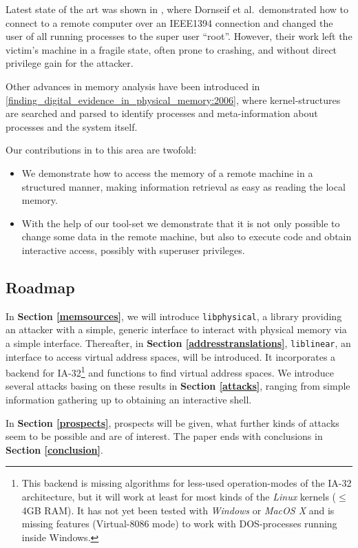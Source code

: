 Latest state of the art was shown in \cite{cansecwest_firewire:2005}, where
Dornseif et al.~demonstrated how to connect to a remote computer over an
IEEE1394 connection and changed the user of all running processes to the super
user "`root"'. However, their work left the victim's machine in a fragile state,
often prone to crashing, and without direct privilege gain for the attacker.

Other advances in memory analysis have been introduced in
\ref{finding_digital_evidence_in_physical_memory:2006}, where kernel-structures
are searched and parsed to identify processes and meta-information about
processes and the system itself.

Our contributions in to this area are twofold: 

\begin{itemize} 

\item We demonstrate how to access the memory of a remote machine in a
structured manner, making information retrieval as easy as reading the local
memory.

\item With the help of our tool-set we demonstrate that it is not only possible
to change some data in the remote machine, but also to execute code and obtain
interactive access, possibly with superuser privileges.

\end{itemize}

\subsection{Roadmap}

In \textbf{Section \ref{memsources}}, we will introduce \texttt{libphysical}, a
library providing an attacker with a simple, generic interface to interact with
physical memory via a simple interface.  Thereafter, in \textbf{Section
\ref{addresstranslations}}, \texttt{liblinear}, an interface to access virtual
address spaces, will be introduced. It incorporates a backend for
IA-32\footnote{This backend is missing algorithms for less-used operation-modes
of the IA-32 architecture, but it will work at least for most kinds of the
\emph{Linux} kernels ($\leq$ 4GB RAM). It has not yet been tested with
\emph{Windows} or \emph{MacOS X} and is missing features (Virtual-8086 mode) to
work with DOS-processes running inside Windows.} and functions to find virtual
address spaces.  We introduce several attacks basing on these results in
\textbf{Section \ref{attacks}}, ranging from simple information gathering up to
obtaining an interactive shell.

In \textbf{Section \ref{prospects}}, prospects will be given, what further kinds
of attacks seem to be possible and are of interest. The paper ends with
conclusions in \textbf{Section \ref{conclusion}}.

